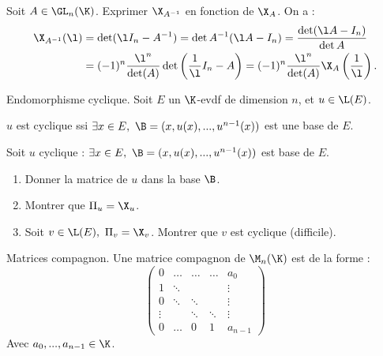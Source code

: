 \documentclass[11pt]{article}
\begin{document}
\begin{exercice}{}{}
    Soit $A\in\GL_n(\K)$. Exprimer $\X_{A^{-1}}$ en fonction de $\X_A$.
    \tcblower
    On a :
    \begin{align*}
        \X_{A^{-1}}(\l) &= \det(\l I_n - A^{-1}) = \det A^{-1}(\l A - I_n) = \frac{\det(\l A - I_n)}{\det A} \\
        &= (-1)^n\frac{\l^n}{\det(A)}\det\left(\frac{1}{\l}I_n - A\right)=(-1)^n\frac{\l^n}{\det(A)}\X_A\left( \frac{1}{\l} \right).
    \end{align*}
\end{exercice}

\begin{defi}{Endomorphisme cyclique.}{}
    Soit $E$ un $\K$-evdf de dimension $n$, et $u\in\L(E)$.
    \begin{center}
        $u$ est cyclique ssi $\exists x \in E, ~ \B=(x,u(x),...,u^{n-1}(x))$ est une base de $E$.
    \end{center}
\end{defi}

\begin{exercice}{}{}
    Soit $u$ cyclique : $\exists x \in E, ~ \B=(x,u(x),...,u^{n-1}(x))$ est base de $E$.
    \begin{enumerate}
        \item Donner la matrice de $u$ dans la base $\B$.
        \item Montrer que $\Pi_u = \X_u$.
        \item Soit $v\in \L(E), ~ \Pi_v = \X_v$. Montrer que $v$ est cyclique (difficile).
    \end{enumerate}
\end{exercice}

\vspace*{-0.7cm}

\begin{defi}{Matrices compagnon.}{}
    Une matrice compagnon de $\M_n(\K)$ est de la forme :
    \begin{equation*}
        \begin{pmatrix}
            0 & \dots & \dots & \dots & a_0 \\
            1 & \ddots & & & \vdots \\
            0 & \ddots & \ddots & & \vdots \\
            \vdots &  & \ddots & \ddots & \vdots\\
            0 & \dots & 0 & 1 & a_{n-1}
        \end{pmatrix}
    \end{equation*}
    Avec $a_0,...,a_{n-1}\in\K$.
\end{defi}
\end{document}
